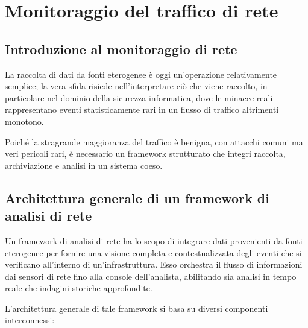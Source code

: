 
\section{Monitoraggio del traffico di rete}

\subsection{Introduzione al monitoraggio di rete}

La raccolta di dati da fonti eterogenee è oggi un'operazione relativamente semplice;
la vera sfida risiede nell'interpretare ciò che viene raccolto, in particolare
nel dominio della sicurezza informatica, dove le minacce reali rappresentano
eventi statisticamente rari in un flusso di traffico altrimenti monotono.

Poiché la stragrande maggioranza del traffico è benigna, con attacchi comuni
ma veri pericoli rari, è necessario un framework
strutturato che integri raccolta, archiviazione e analisi in un sistema coeso.

\subsection{Architettura generale di un framework di analisi di rete}

Un framework di analisi di rete ha lo scopo di integrare dati provenienti da fonti eterogenee
per fornire una visione completa e contestualizzata degli eventi che si verificano
all'interno di un'infrastruttura.
Esso orchestra il flusso di informazioni dai sensori di rete fino alla console dell'analista,
abilitando sia analisi in tempo reale che indagini storiche approfondite.

L'architettura generale di tale framework si basa su diversi componenti interconnessi:

